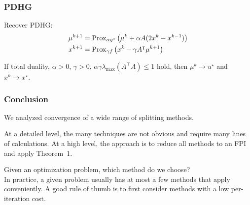 \documentclass[10pt,mathserif]{beamer}
\begin{document}
\begin{frame}
\frametitle{PDHG}
Recover PDHG:
\begin{align*}
\mu^{k+1}&=\mathrm{Prox}_{\alpha  g^*}
\left(
\mu^k+\alpha A(2x^k-x^{k-1})
\right)\\
x^{k+1}&=
\mathrm{Prox}_{\gamma f}\left(
x^k-\gamma A^\intercal\mu^{k+1}\right)
\end{align*}

\vspace{0.2in}

If total duality, $\alpha>0$, $\gamma>0$, $\alpha\gamma\lambda_\mathrm{max}(A^\intercal A)\le1$ hold, then $\mu^k\rightarrow  u ^\star$ and $x^k\rightarrow x^\star$.
\end{frame}


\begin{frame}
\frametitle{Conclusion}
We analyzed convergence of a wide range of splitting methods.
\vspace{0.2in}


At a detailed level, the many techniques are not obvious and require many lines of calculations.
At a high level, the approach is to reduce all methods to an FPI and apply Theorem~1.
\vspace{0.2in}

Given an optimization problem, which method do we choose?\\
In practice, a given problem usually has at most a few methods that apply conveniently.
A good rule of thumb is to first consider methods with a low per-iteration cost.

\end{frame}

\iffalse
\fi
\end{document}
